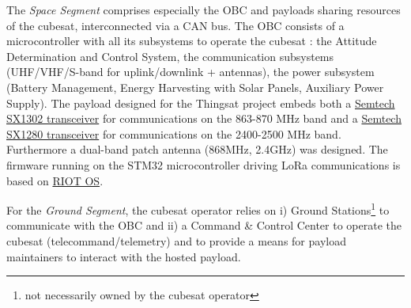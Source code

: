 The \textit{Space Segment}  comprises especially the OBC and payloads sharing resources of the cubesat, interconnected via a CAN bus.
The OBC
consists of a microcontroller with all its subsystems to operate the cubesat :
the Attitude Determination and Control System, the communication subsystems
(UHF/VHF/S-band for uplink/downlink + antennas), the power subsystem (Battery
Management, Energy Harvesting with Solar Panels, Auxiliary Power Supply). The
payload designed for the Thingsat project embeds both a
\href{https://www.semtech.com/products/wireless-rf/lora-gateways/sx1302}{Semtech
SX1302 transceiver} for communications on the 863-870 MHz band and a
\href{https://www.semtech.com/products/wireless-rf/24-ghz-transceivers/sx1280}{Semtech
SX1280 transceiver} for communications on the 2400-2500 MHz band. Furthermore a dual-band patch antenna (868MHz, 2.4GHz) was designed. The firmware running on the STM32 microcontroller driving LoRa communications is based on \href{https://github.com/RIOT-OS/RIOT}{RIOT
OS}.


For the \textit{Ground Segment}, the cubesat operator relies on 
i) Ground
Stations\footnote{not necessarily owned by the cubesat operator} to communicate
with the OBC and 
ii) a Command \& Control Center to operate the cubesat
(telecommand/telemetry) and to provide a means for payload maintainers to
interact with the hosted payload.



